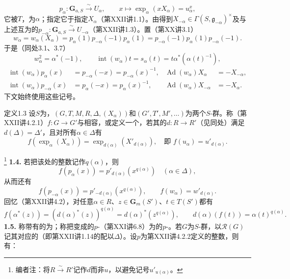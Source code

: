 \[p_\alpha:\mathbf G_{a,S}\xrightarrow\sim U_\alpha,\qquad x\longmapsto\exp_\alpha(xX_\alpha)=u_\alpha^x,\]
它被$T$，为$\alpha$；指定它于指定$X_\alpha$（第XXII讲1.1）。由得到$X_{-\alpha}\in\Gamma(S,\mathfrak g_{-\alpha})^\times$及与上述互为的$p_{-\alpha}:\mathbf G_{a,S}\xrightarrow\sim U_{-\alpha}$（第XXII讲1.3）。置（第XX讲3.1）
\[w_\alpha=w_\alpha(X_\alpha)=p_\alpha(1)p_{-\alpha}(-1)p_\alpha(1)=p_{-\alpha}(-1)p_\alpha(1)p_{-\alpha}(-1).\]
于是（同处3.1、3.7）
\[w_\alpha^2=\alpha^*(-1),\qquad \operatorname{int}(w_\alpha)t=s_\alpha(t)=t\alpha^*(\alpha(t)^{-1}),\]
\[\begin{aligned}\operatorname{int}(w_\alpha)p_\alpha(x)&=p_{-\alpha}(-x)=p_{-\alpha}(x)^{-1},&\operatorname{Ad}(w_\alpha)X_\alpha&=-X_{-\alpha},\\
\operatorname{int}(w_\alpha)p_{-\alpha}(x)&=p_\alpha(-x)=p_\alpha(x)^{-1},&\operatorname{Ad}(w_\alpha)X_{-\alpha}&=-X_\alpha.\end{aligned}\]
下文始终使用这些记号。
\begin{SGAresult}{定义}{1.3}
设$S$为，$(G,T,M,R,\Delta,(X_\alpha))$和$(G',T',M',\ldots)$为两个$S$-群。称（第XXII讲4.2.1）$f:G\to G'$与相容，或定义一个，若其的$d:R\to R'$（见同处）满足$d(\Delta)=\Delta'$，且对所有$\alpha\in\Delta$有
\[f(\exp_\alpha(X_\alpha))=\exp_{d(\alpha)}(X'_{d(\alpha)}),\quad\text{即 }f(u_\alpha)=u'_{d(\alpha)}.\]
\end{SGAresult}
\footnote{编者注：将$R\xrightarrow\sim R'$记作$d$而非$u$，以避免记号$u'_{u(\alpha)}$。}
\textbf{1.4.} 若把该处的整数记作$q(\alpha)$，则
\[f(p_\alpha(x))=p'_{d(\alpha)}(x^{q(\alpha)})\quad(\alpha\in\Delta),\]
从而还有
\[f(p_{-\alpha}(x))=p'_{-d(\alpha)}(x^{q(\alpha)}),\qquad f(w_\alpha)=w'_{d(\alpha)}.\]
回忆（第XXII讲4.2），对任意$\alpha\in R$、$z\in\mathbf G_m(S')$、$t\in T(S')$都有
\[f(\alpha^*(z))=(d(\alpha)^*(z))^{q(\alpha)}=d(\alpha)^*(z^{q(\alpha)}),\qquad d(\alpha)(f(t))=\alpha(t)^{q(\alpha)}.\]
\textbf{1.5.} 称带有的为；称把变成的$p$-（第XXI讲6.8）为的$p$-。若$G$为$S$-群，以$\mathcal R(G)$记其对应的（即第XXII讲1.14的配以$\Delta$）。设$p$为第XXII讲4.2.2定义的整数，则有：
